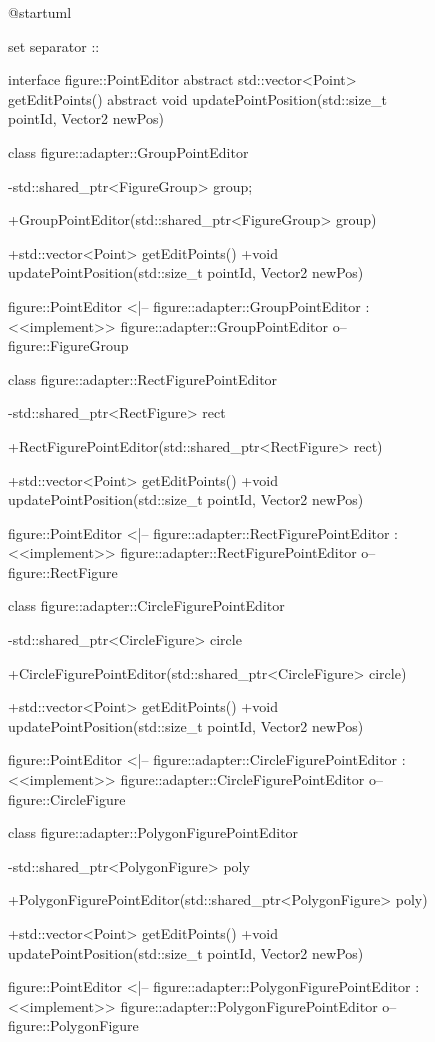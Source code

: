 \documentclass[a4paper,12pt]{article}
\begin{document}
\begin{figure}[H]

\begin{plantuml}
@startuml

set separator ::

interface figure::PointEditor {
  {abstract} std::vector<Point> getEditPoints()
  {abstract} void updatePointPosition(std::size_t pointId, Vector2 newPos)
}

class figure::adapter::GroupPointEditor {
  -std::shared_ptr<FigureGroup> group;

  +GroupPointEditor(std::shared_ptr<FigureGroup> group)

  +std::vector<Point> getEditPoints()
  +void updatePointPosition(std::size_t pointId, Vector2 newPos)
}

figure::PointEditor <|-- figure::adapter::GroupPointEditor : <<implement>>
figure::adapter::GroupPointEditor o-- figure::FigureGroup

class figure::adapter::RectFigurePointEditor {
  -std::shared_ptr<RectFigure> rect

  +RectFigurePointEditor(std::shared_ptr<RectFigure> rect)

  +std::vector<Point> getEditPoints()
  +void updatePointPosition(std::size_t pointId, Vector2 newPos)
}

figure::PointEditor <|-- figure::adapter::RectFigurePointEditor : <<implement>>
figure::adapter::RectFigurePointEditor o-- figure::RectFigure

class figure::adapter::CircleFigurePointEditor {
  -std::shared_ptr<CircleFigure> circle

  +CircleFigurePointEditor(std::shared_ptr<CircleFigure> circle)

  +std::vector<Point> getEditPoints()
  +void updatePointPosition(std::size_t pointId, Vector2 newPos)
}

figure::PointEditor <|-- figure::adapter::CircleFigurePointEditor : <<implement>>
figure::adapter::CircleFigurePointEditor o-- figure::CircleFigure

class figure::adapter::PolygonFigurePointEditor {
  -std::shared_ptr<PolygonFigure> poly

  +PolygonFigurePointEditor(std::shared_ptr<PolygonFigure> poly)

  +std::vector<Point> getEditPoints()
  +void updatePointPosition(std::size_t pointId, Vector2 newPos)
}

figure::PointEditor <|-- figure::adapter::PolygonFigurePointEditor : <<implement>>
figure::adapter::PolygonFigurePointEditor o-- figure::PolygonFigure
  


\end{plantuml}
\end{figure}
\end{document}

